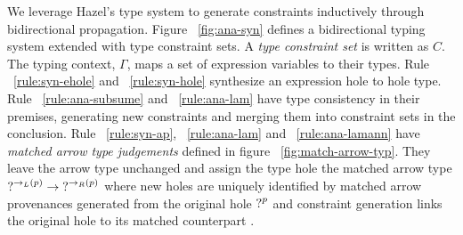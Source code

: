 We leverage Hazel's type system to generate constraints inductively through bidirectional propagation. Figure ~\ref{fig:ana-syn} defines a bidirectional typing system extended with type constraint sets. A \emph{type constraint set} is written as $C$. The typing context, $\Gamma$, maps a set of expression variables to their types. Rule ~\ref{rule:syn-ehole} and ~\ref{rule:syn-hole} synthesize an expression hole to hole type. Rule ~\ref{rule:ana-subsume} and ~\ref{rule:ana-lam} have type consistency in their premises, generating new constraints and merging them into constraint sets in the conclusion. Rule ~\ref{rule:syn-ap}, ~\ref{rule:ana-lam} and ~\ref{rule:ana-lamann} have \emph{matched arrow type judgements} defined in figure ~\ref{fig:match-arrow-typ}. They leave the arrow type unchanged and assign the type hole the matched arrow type $\mathtt{?}^{\rightarrow_{L}(p)} \rightarrow \mathtt{?}^{\rightarrow_{R}(p)}$ where new holes are uniquely identified by matched arrow provenances generated from the original hole $\mathtt{?}^{p}$ and constraint generation links the original hole to its matched counterpart \cite{HazelnutPOPL}.


